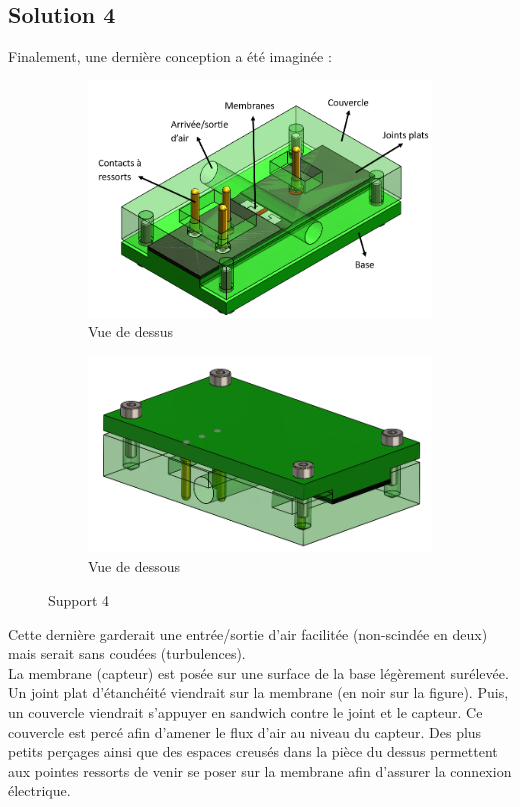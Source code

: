 \subsection{Solution 4}
Finalement, une dernière conception a été imaginée :
\begin{figure}[H]
    \centering
    \begin{subfigure}{0.45\textwidth}
        \includegraphics[scale = 0.45]{images/Design5_dessus.png}
        \caption{Vue de dessus}
    \end{subfigure}
    \hspace{1cm}
    \begin{subfigure}{0.3\textwidth}
        \includegraphics[scale = 0.3]{images/Design5_dessous.png}
        \caption{Vue de dessous}
    \end{subfigure}
    \caption{Support 4}
    \label{fig:solution4}
\end{figure}

Cette dernière garderait une entrée/sortie d'air facilitée (non-scindée en deux) mais serait sans coudées (turbulences).\\
La membrane (capteur) est posée sur une surface de la base légèrement surélevée. Un joint plat d'étanchéité viendrait sur la membrane (en noir
sur la figure). Puis, un couvercle viendrait s'appuyer en sandwich contre le joint et le capteur. Ce couvercle est percé afin d'amener le flux 
d'air au niveau du capteur. Des plus petits perçages ainsi que des espaces creusés dans la pièce du dessus permettent aux pointes ressorts de 
venir se poser sur la membrane afin d'assurer la connexion électrique.\\

